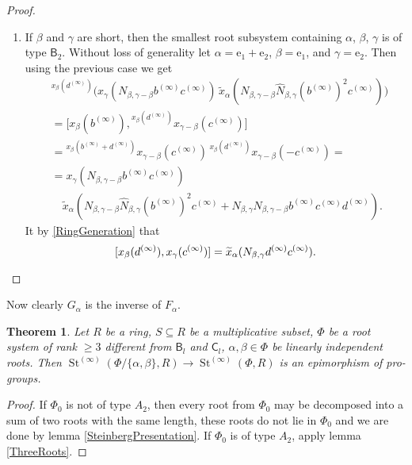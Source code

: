 \documentclass{article}
\numberwithin{equation}{section}
\newtheorem{theorem}{Theorem}
\theoremstyle{definition}
\theoremstyle{remark}
\DeclareMathOperator\St{St}
\newcommand{\up}[2]{{^{#1}\!{#2}}}
\newcommand{\rB}{\mathsf{B}}
\newcommand{\rC}{\mathsf{C}}
\begin{document}
\begin{proof}
\begin{enumerate}
 \item If \(\beta\) and \(\gamma\) are short, then the smallest root subsystem containing \(\alpha\), \(\beta\), \(\gamma\) is of type \(\rB_2\). Without loss of generality let \(\alpha = \mathrm e_1 + \mathrm e_2\), \(\beta = \mathrm e_1\), and \(\gamma = \mathrm e_2\). Then using the previous case we get
 \begin{align*}
  &\up{x_\beta(d^{(\infty)})}
   {\bigl(x_\gamma(N_{\beta, \gamma - \beta} b^{(\infty)} c^{(\infty)})\,
   \widetilde x_\alpha(N_{\beta, \gamma - \beta} \widehat N_{\beta, \gamma}
   (b^{(\infty)})^2 c^{(\infty)})\bigr)}\\
  &= \bigl[x_\beta(b^{(\infty)}),
  \up{x_\beta(d^{(\infty)})}
   {x_{\gamma - \beta}(c^{(\infty)})}\bigr]\\
  &= \up{x_\beta(b^{(\infty)} + d^{(\infty)})}
   {x_{\gamma - \beta}(c^{(\infty)})}\,
  \up{x_\beta(d^{(\infty)})}
   {x_{\gamma - \beta}(-c^{(\infty)})} =\\
  &= x_\gamma(N_{\beta, \gamma - \beta} b^{(\infty)} c^{(\infty)})\\
  &\quad \widetilde x_\alpha(N_{\beta, \gamma - \beta} \widehat N_{\beta, \gamma}
   (b^{(\infty)})^2 c^{(\infty)}
   + N_{\beta, \gamma} N_{\beta, \gamma - \beta}
   b^{(\infty)} c^{(\infty)} d^{(\infty)}).
 \end{align*}
 It by \cref{RingGeneration} that
 \[[x_\beta(d^{(\infty)}), x_\gamma(c^{(\infty)})] 
 = \widetilde x_\alpha(N_{\beta, \gamma} d^{(\infty)} c^{(\infty)}).\qedhere\]
 \end{enumerate}
\end{proof}
 
 Now clearly \(G_\alpha\) is the inverse of \(F_\alpha\).


 \begin{theorem}\label{DoubleRootElimination}
  Let \(R\) be a ring, \(S \subseteq R\) be a multiplicative subset, \(\Phi\) be a root system of rank \(\geq 3\) different from \(\rB_l\) and \(\rC_l\), \(\alpha, \beta \in \Phi\) be linearly independent roots. Then \(\St^{(\infty)}(\Phi / \{\alpha, \beta\}, R) \to \St^{(\infty)}(\Phi, R)\) is an epimorphism of pro-groups.
 \end{theorem}
 \begin{proof}
  If \(\Phi_0\) is not of type \(A_2\), then every root from \(\Phi_0\) may be decomposed into a sum of two roots with the same length, these roots do not lie in \(\Phi_0\) and we are done by lemma \ref{SteinbergPresentation}. If \(\Phi_0\) is of type \(A_2\), apply lemma \ref{ThreeRoots}.
 \end{proof}
\end{document}
